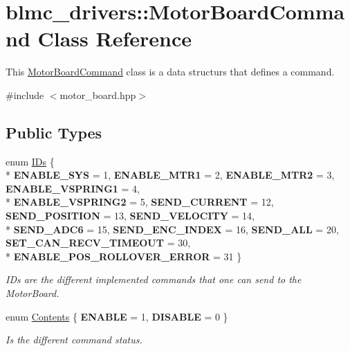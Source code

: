 \hypertarget{classblmc__drivers_1_1MotorBoardCommand}{}\section{blmc\+\_\+drivers\+:\+:Motor\+Board\+Command Class Reference}
\label{classblmc__drivers_1_1MotorBoardCommand}


This \hyperlink{classblmc__drivers_1_1MotorBoardCommand}{Motor\+Board\+Command} class is a data structurs that defines a command.  




{\ttfamily \#include $<$motor\+\_\+board.\+hpp$>$}

\subsection*{Public Types}
\begin{DoxyCompactItemize}
\item 
enum \hyperlink{classblmc__drivers_1_1MotorBoardCommand_abdbd6eb70164938ea91ae02000ccf7b2}{I\+Ds} \{ \\*
{\bfseries E\+N\+A\+B\+L\+E\+\_\+\+S\+YS} = 1, 
{\bfseries E\+N\+A\+B\+L\+E\+\_\+\+M\+T\+R1} = 2, 
{\bfseries E\+N\+A\+B\+L\+E\+\_\+\+M\+T\+R2} = 3, 
{\bfseries E\+N\+A\+B\+L\+E\+\_\+\+V\+S\+P\+R\+I\+N\+G1} = 4, 
\\*
{\bfseries E\+N\+A\+B\+L\+E\+\_\+\+V\+S\+P\+R\+I\+N\+G2} = 5, 
{\bfseries S\+E\+N\+D\+\_\+\+C\+U\+R\+R\+E\+NT} = 12, 
{\bfseries S\+E\+N\+D\+\_\+\+P\+O\+S\+I\+T\+I\+ON} = 13, 
{\bfseries S\+E\+N\+D\+\_\+\+V\+E\+L\+O\+C\+I\+TY} = 14, 
\\*
{\bfseries S\+E\+N\+D\+\_\+\+A\+D\+C6} = 15, 
{\bfseries S\+E\+N\+D\+\_\+\+E\+N\+C\+\_\+\+I\+N\+D\+EX} = 16, 
{\bfseries S\+E\+N\+D\+\_\+\+A\+LL} = 20, 
{\bfseries S\+E\+T\+\_\+\+C\+A\+N\+\_\+\+R\+E\+C\+V\+\_\+\+T\+I\+M\+E\+O\+UT} = 30, 
\\*
{\bfseries E\+N\+A\+B\+L\+E\+\_\+\+P\+O\+S\+\_\+\+R\+O\+L\+L\+O\+V\+E\+R\+\_\+\+E\+R\+R\+OR} = 31
 \}\hypertarget{classblmc__drivers_1_1MotorBoardCommand_abdbd6eb70164938ea91ae02000ccf7b2}{}\label{classblmc__drivers_1_1MotorBoardCommand_abdbd6eb70164938ea91ae02000ccf7b2}
\begin{DoxyCompactList}\small\item\em I\+Ds are the different implemented commands that one can send to the Motor\+Board. \end{DoxyCompactList}
\item 
enum \hyperlink{classblmc__drivers_1_1MotorBoardCommand_ad61acf8dcb8f6fcb382fc5cbc1e44615}{Contents} \{ {\bfseries E\+N\+A\+B\+LE} = 1, 
{\bfseries D\+I\+S\+A\+B\+LE} = 0
 \}\hypertarget{classblmc__drivers_1_1MotorBoardCommand_ad61acf8dcb8f6fcb382fc5cbc1e44615}{}\label{classblmc__drivers_1_1MotorBoardCommand_ad61acf8dcb8f6fcb382fc5cbc1e44615}
\begin{DoxyCompactList}\small\item\em Is the different command status. \end{DoxyCompactList}
\end{DoxyCompactItemize}

